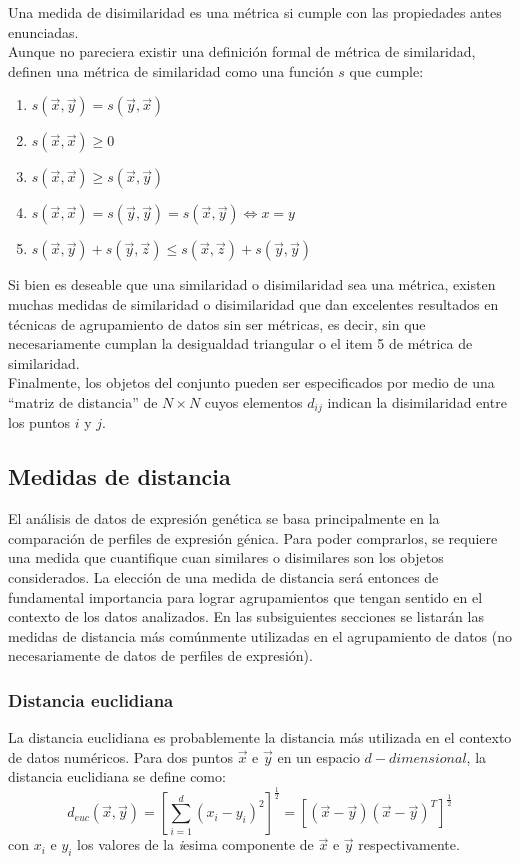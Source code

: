 Una medida de disimilaridad es una métrica si cumple con las propiedades antes enunciadas. \\
Aunque no pareciera existir una definición formal de métrica de similaridad, \cite{Chen2009} definen una métrica de similaridad como una función $s$ que cumple:
\begin{enumerate}
\item $s(\vec{x}, \vec{y}) = s(\vec{y}, \vec{x})$
\item $s(\vec{x}, \vec{x}) \geq 0$
\item $s(\vec{x}, \vec{x}) \geq s(\vec{x}, \vec{y})$
\item $s(\vec{x}, \vec{x}) = s(\vec{y}, \vec{y}) = s(\vec{x}, \vec{y}) \iff x=y$
\item $s(\vec{x}, \vec{y}) + s(\vec{y}, \vec{z}) \leq s(\vec{x}, \vec{z}) + s(\vec{y}, \vec{y})$
\end{enumerate}
Si bien es deseable que una similaridad o disimilaridad sea una métrica, existen muchas medidas de similaridad o disimilaridad que dan excelentes resultados en técnicas de agrupamiento de datos sin ser métricas, es decir, sin que necesariamente cumplan la desigualdad triangular o el item 5 de métrica de similaridad.\\
Finalmente, los objetos del conjunto pueden ser especificados por medio de una ``matriz de distancia'' de $N\times N$ cuyos elementos $d_{ij}$ indican la disimilaridad entre los puntos $i$ y $j$.\cite{Halkidi2001}\cite{Domany1999}\cite{Gan2007}\cite{Kheng2010}

\subsection{Medidas de distancia}
El análisis de datos de expresión genética se basa principalmente en la comparación de perfiles de expresión génica. Para poder comprarlos, se requiere una medida que cuantifique cuan similares o disimilares son los objetos considerados. La elección de una medida de distancia será entonces de fundamental importancia para lograr agrupamientos que tengan sentido en el contexto de los datos analizados. En las subsiguientes secciones se listarán las medidas de distancia más comúnmente utilizadas en el agrupamiento de datos (no necesariamente de datos de perfiles de expresión).
\subsubsection{Distancia euclidiana}
La distancia euclidiana es probablemente la distancia más utilizada en el contexto de datos numéricos. Para dos puntos $\vec{x}$ e $\vec{y}$ en un espacio $d-dimensional$, la distancia euclidiana se define como:
\begin{equation}
	d_{euc}(\vec{x}, \vec{y}) = [\sum\limits_{i=1}^d (x_i-y_i)^2]^\frac{1}{2} = [(\vec{x}-\vec{y})(\vec{x}-\vec{y})^T]^\frac{1}{2}
\end{equation}
con $x_i$ e $y_i$ los valores de la \textit{i}esima componente de $\vec{x}$ e $\vec{y}$ respectivamente.

